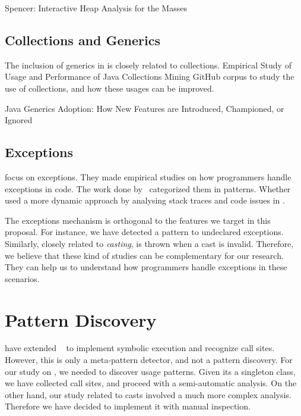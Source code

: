 Spencer: Interactive Heap Analysis for the Masses
\cite{DBLP:journals/corr/BrandauerW17}


\subsection*{Collections and Generics}

The inclusion of generics in \java{} is closely related to collections.
Empirical Study of Usage and Performance of Java Collections
Mining GitHub corpus to study the use of collections, and how these usages can be improved.
\cite{Costa:2017:ESU:3030207.3030221}

Java Generics Adoption: How New Features are Introduced, Championed, or Ignored~\cite{Parnin:2011:JGA:1985441.1985446}


\subsection*{Exceptions}

\cite{Kery:2016:EPP:2901739.2903497,Asaduzzaman:2016:DUE:2901739.2903500} focus on exceptions.
They made empirical studies on how programmers handle exceptions in \java{} code.
The work done by~\cite{Nakshatri:2016:AEH:2901739.2903499} categorized them in patterns.
Whether~\cite{7180074} used a more dynamic approach by analysing stack traces and code issues in \github{}.

The exceptions mechanism is orthogonal to the features we target in this proposal.
For instance, we have detected a \smu{} pattern to \throw{} undeclared exceptions.
Similarly, closely related to \emph{casting}, \cce{} is thrown when a cast is invalid.
Therefore, we believe that these kind of studies can be complementary for our research. They can help us to understand how programmers handle exceptions in these scenarios.


\section{Pattern Discovery}

\cite{5463349} have extended \asm{}~\cite{Bruneton02asm:a,Kuleshov07} to implement symbolic execution and recognize call sites.
However, this is only a meta-pattern detector, and not a pattern discovery.
For our study on \smu{}, we needed to discover usage patterns.
Given its a singleton class, we have collected call sites,
and proceed with a semi-automatic analysis.
On the other hand, our study related to casts involved a much more complex analysis.
Therefore we have decided to implement it with manual inspection.

